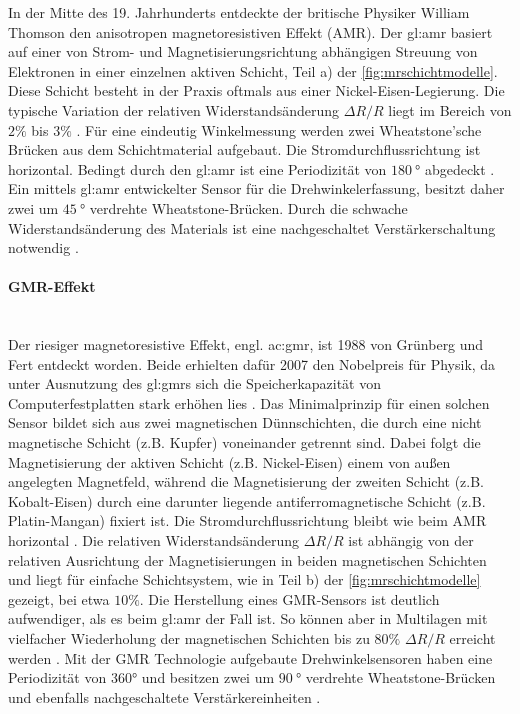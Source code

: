 In der Mitte des 19. Jahrhunderts entdeckte der britische Physiker William Thomson den anisotropen magnetoresistiven Effekt (AMR). Der \gls{gl:amr} basiert auf einer von Strom- und Magnetisierungsrichtung abhängigen Streuung von Elektronen in einer einzelnen aktiven Schicht, Teil a) der \autoref{fig:mrschichtmodelle}. Diese Schicht besteht in der Praxis oftmals aus einer Nickel-Eisen-Legierung. Die typische Variation der relativen Widerstandsänderung $\Delta R/R$ liegt im Bereich von $2\%$ bis $3\%$ \cite{Tille2020}. Für eine eindeutig Winkelmessung werden zwei Wheatstone'sche Brücken aus dem Schichtmaterial aufgebaut. Die Stromdurchflussrichtung ist horizontal. Bedingt durch den \gls{gl:amr} ist eine Periodizität von $\SI{180}{\degree}$ abgedeckt \cite{Lemme2016}\cite{Tille2020}. Ein mittels \gls{gl:amr} entwickelter Sensor für die Drehwinkelerfassung, besitzt daher zwei um $\SI{45}{\degree}$ verdrehte Wheatstone-Brücken. Durch die schwache Widerstandsänderung des Materials ist eine nachgeschaltet Verstärkerschaltung notwendig \cite{NXPSemiconductors2014}.


\paragraph{GMR-Effekt}\label{par:GMR}$~$\\


Der riesiger magnetoresistive Effekt, engl. \gls{ac:gmr},  ist 1988 von Grünberg und Fert entdeckt worden. Beide erhielten dafür 2007 den Nobelpreis für Physik, da unter Ausnutzung des \gls{gl:gmr}s sich die Speicherkapazität von Computerfestplatten stark erhöhen lies \cite{Lemme2016}. Das Minimalprinzip für einen solchen Sensor bildet sich aus zwei magnetischen Dünnschichten, die durch eine nicht magnetische Schicht (z.B. Kupfer) voneinander getrennt sind. Dabei folgt die Magnetisierung der aktiven Schicht (z.B. Nickel-Eisen) einem von außen angelegten Magnetfeld, während die Magnetisierung der zweiten Schicht (z.B. Kobalt-Eisen) durch eine darunter liegende antiferromagnetische Schicht (z.B. Platin-Mangan) fixiert ist. Die Stromdurchflussrichtung bleibt wie beim AMR horizontal \cite{Lemme2016}\cite{Tille2020}. Die relativen Widerstandsänderung $\Delta R/R$ ist abhängig von der relativen Ausrichtung der Magnetisierungen in beiden magnetischen Schichten und liegt für einfache Schichtsystem, wie in Teil b) der \autoref{fig:mrschichtmodelle} gezeigt, bei etwa $10\%$. Die Herstellung eines GMR-Sensors ist deutlich aufwendiger, als es beim \gls{gl:amr} der Fall ist. So können aber in Multilagen mit vielfacher Wiederholung der magnetischen Schichten bis zu
$80\%$ $\Delta R/R$ erreicht werden \cite{Tille2020}. Mit der GMR Technologie aufgebaute Drehwinkelsensoren haben eine Periodizität von 360° und besitzen zwei um $\SI{90}{\degree}$ verdrehte Wheatstone-Brücken und ebenfalls nachgeschaltete Verstärkereinheiten \cite{infineon2018}.


